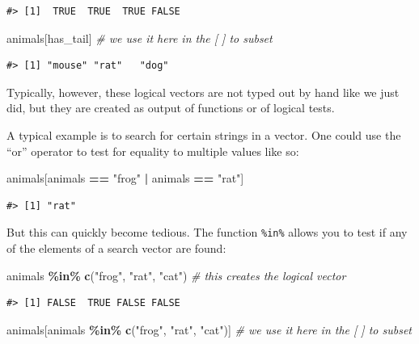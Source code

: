 \documentclass[
]{book}
\newenvironment{Shaded}{\begin{snugshade}}{\end{snugshade}}
\newcommand{\CommentTok}[1]{\textcolor[rgb]{0.56,0.35,0.01}{\textit{#1}}}
\newcommand{\FunctionTok}[1]{\textcolor[rgb]{0.13,0.29,0.53}{\textbf{#1}}}
\newcommand{\NormalTok}[1]{#1}
\newcommand{\SpecialCharTok}[1]{\textcolor[rgb]{0.81,0.36,0.00}{\textbf{#1}}}
\newcommand{\StringTok}[1]{\textcolor[rgb]{0.31,0.60,0.02}{#1}}
\begin{document}
\begin{verbatim}
#> [1]  TRUE  TRUE  TRUE FALSE
\end{verbatim}

\begin{Shaded}
\begin{Highlighting}[]
\NormalTok{animals[has\_tail] }\CommentTok{\# we use it here in the [ ] to subset}
\end{Highlighting}
\end{Shaded}

\begin{verbatim}
#> [1] "mouse" "rat"   "dog"
\end{verbatim}

Typically, however, these logical vectors are not typed out by hand like we just did, but they are created as output of functions or of logical tests.

A typical example is to search for certain strings in a vector. One could use the
``or'' operator \texttt{\textbar{}} to test for equality to multiple values like so:

\begin{Shaded}
\begin{Highlighting}[]
\NormalTok{animals[animals }\SpecialCharTok{==} \StringTok{"frog"} \SpecialCharTok{|}\NormalTok{ animals }\SpecialCharTok{==} \StringTok{"rat"}\NormalTok{] }
\end{Highlighting}
\end{Shaded}

\begin{verbatim}
#> [1] "rat"
\end{verbatim}

But this can quickly become tedious. The function \texttt{\%in\%} allows you to test if any of the elements of a search vector are found:

\begin{Shaded}
\begin{Highlighting}[]
\NormalTok{animals }\SpecialCharTok{\%in\%} \FunctionTok{c}\NormalTok{(}\StringTok{"frog"}\NormalTok{, }\StringTok{"rat"}\NormalTok{, }\StringTok{"cat"}\NormalTok{) }\CommentTok{\# this creates the logical vector}
\end{Highlighting}
\end{Shaded}

\begin{verbatim}
#> [1] FALSE  TRUE FALSE FALSE
\end{verbatim}

\begin{Shaded}
\begin{Highlighting}[]
\NormalTok{animals[animals }\SpecialCharTok{\%in\%} \FunctionTok{c}\NormalTok{(}\StringTok{"frog"}\NormalTok{, }\StringTok{"rat"}\NormalTok{, }\StringTok{"cat"}\NormalTok{)] }\CommentTok{\# we use it here in the [ ] to subset}
\end{Highlighting}
\end{Shaded}
\end{document}
